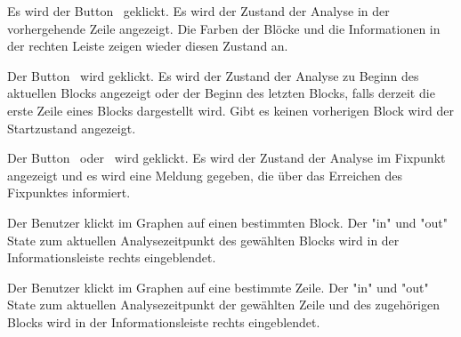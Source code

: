 {Es wird der Button \faBackward\ geklickt.}
{Es wird der Zustand der Analyse in der vorhergehende Zeile angezeigt. Die Farben der Blöcke und die Informationen in der rechten Leiste zeigen wieder diesen Zustand an.}

{Der Button \faFastBackward\ wird geklickt.}
{Es wird der Zustand der Analyse zu Beginn des aktuellen Blocks angezeigt oder der Beginn des letzten Blocks, falls derzeit die erste Zeile eines Blocks dargestellt wird. Gibt es keinen vorherigen Block wird der Startzustand angezeigt.}

{Der Button \faForward\ oder \faFastForward\ wird geklickt.}
{Es wird der Zustand der Analyse im Fixpunkt angezeigt und es wird eine Meldung gegeben, die über das Erreichen des Fixpunktes informiert.}

\tests{}

{Der Benutzer klickt im Graphen auf einen bestimmten Block.}
{Der "in" und "out" State zum aktuellen Analysezeitpunkt des gewählten Blocks wird in der Informationsleiste rechts eingeblendet.}

{Der Benutzer klickt im Graphen auf eine bestimmte Zeile.}
{Der "in" und "out" State zum aktuellen Analysezeitpunkt der gewählten Zeile und des zugehörigen Blocks wird in der Informationsleiste rechts eingeblendet.}